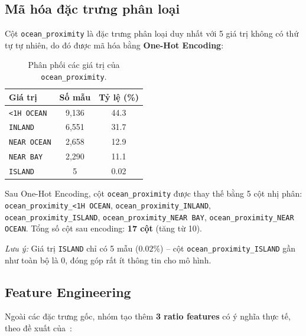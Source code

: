 \documentclass[12pt, a4paper]{article}
\begin{document}
\subsection{Mã hóa đặc trưng phân loại}

Cột \texttt{ocean\_proximity} là đặc trưng phân loại duy nhất với
5 giá trị không có thứ tự tự nhiên, do đó được mã hóa bằng
\textbf{One-Hot Encoding}:

\begin{table}[H]
  \centering
  \caption{Phân phối các giá trị của \texttt{ocean\_proximity}.}
  \label{tab:ocean_proximity}
  \begin{tabular}{lcc}
    \toprule
    \textbf{Giá trị} & \textbf{Số mẫu} & \textbf{Tỷ lệ (\%)} \\
    \midrule
    \texttt{<1H OCEAN}  & 9{,}136 & 44.3 \\
    \texttt{INLAND}     & 6{,}551 & 31.7 \\
    \texttt{NEAR OCEAN} & 2{,}658 & 12.9 \\
    \texttt{NEAR BAY}   & 2{,}290 & 11.1 \\
    \texttt{ISLAND}     & 5       & 0.02 \\
    \bottomrule
  \end{tabular}
\end{table}

Sau One-Hot Encoding, cột \texttt{ocean\_proximity} được thay thế bằng
5 cột nhị phân: \texttt{ocean\_proximity\_<1H OCEAN},
\texttt{ocean\_proximity\_INLAND}, \texttt{ocean\_proximity\_ISLAND},
\texttt{ocean\_proximity\_NEAR BAY}, \texttt{ocean\_proximity\_NEAR OCEAN}.
Tổng số cột sau encoding: \textbf{17 cột} (tăng từ 10).

\textit{Lưu ý:} Giá trị \texttt{ISLAND} chỉ có 5 mẫu ($0.02\%$) --
cột \texttt{ocean\_proximity\_ISLAND} gần như toàn bộ là 0, đóng góp
rất ít thông tin cho mô hình.

\subsection{Feature Engineering}

Ngoài các đặc trưng gốc, nhóm tạo thêm \textbf{3 ratio features}
có ý nghĩa thực tế, theo đề xuất của~\cite{geron2019}:
\end{document}
